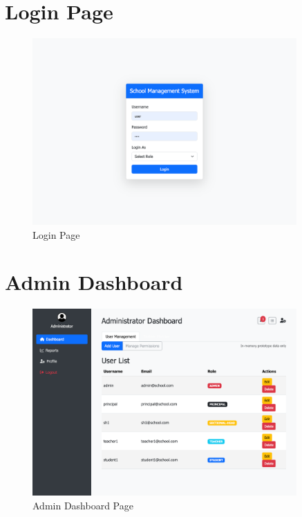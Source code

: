 \documentclass[12pt,a4paper]{report}
\begin{document}
\section{Login Page}
\begin{figure}[htbp]
    \centering
    \includegraphics[width=0.9\textwidth]{login-page.png}
    \caption{Login Page}
    \label{fig:login-page}
\end{figure}

\section{Admin Dashboard}
\begin{figure}[htbp]
    \centering
    \includegraphics[width=0.9\textwidth]{admin-dashboard-page.png}
    \caption{Admin Dashboard Page}
    \label{fig:admin-dashboard-page}
\end{figure}
\end{document}
